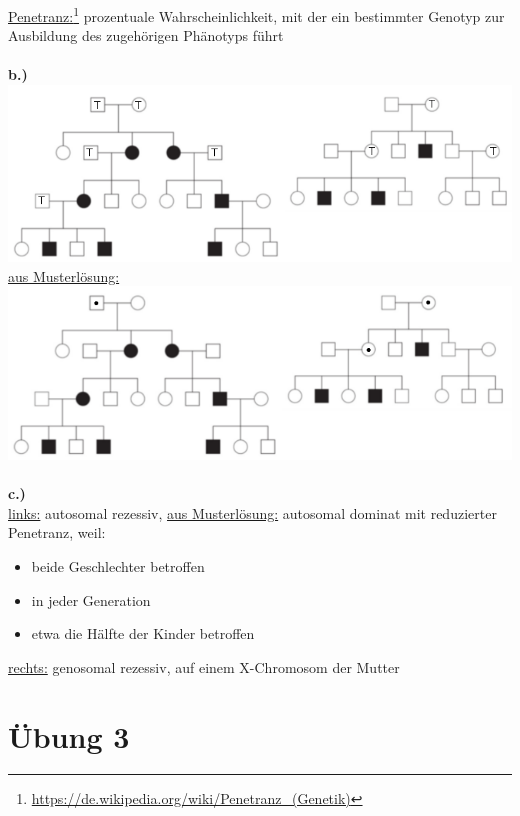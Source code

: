\documentclass[13pt,a4paper]{article}
\begin{document}
\underline{Penetranz:}\footnote{\url{https://de.wikipedia.org/wiki/Penetranz_(Genetik)}} prozentuale Wahrscheinlichkeit, mit der ein bestimmter Genotyp zur Ausbildung des zugehörigen Phänotyps führt
\\\\
\textbf{b.)}\\
\includegraphics[width=1\textwidth]{pix/exercise2/stammbaeume1.png}
\newpage
\underline{aus Musterlösung:}\\
\includegraphics[width=1\textwidth]{pix/exercise2/standard_solution.png}
\\\\
\textbf{c.)}\\
\underline{links:} autosomal rezessiv, \underline{aus Musterlösung:} autosomal dominat mit reduzierter Penetranz, weil:
\begin{itemize}
	\item beide Geschlechter betroffen
	\item in jeder Generation
	\item etwa die Hälfte der Kinder betroffen
\end{itemize}

\underline{rechts:} genosomal rezessiv, auf einem X-Chromosom der Mutter\\

\newpage
\section{Übung 3}
\end{document}
